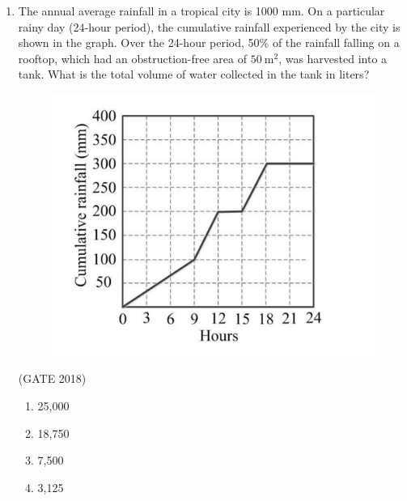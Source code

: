 \documentclass[journal,12pt,onecolumn]{IEEEtran}
\theoremstyle{remark}
\begin{document}
\begin{enumerate}
\item The annual average rainfall in a tropical city is 1000 mm. On a particular rainy day (24-hour period), the cumulative rainfall experienced by the city is shown in the graph. Over the 24-hour period, 50\% of the rainfall falling on a rooftop, which had an obstruction-free area of $50~\text{m}^2$, was harvested into a tank. What is the total volume of water collected in the tank in liters?
\begin{figure}[h]
    \centering
    \includegraphics[width=0.5\linewidth]{GATE-CE-2018/8A-2.png}
    \caption{}
    \label{8a-2}
\end{figure}
\hfill{(GATE 2018)}
\begin{multicols}{4}
\begin{enumerate}
    \item 25,000
    \item 18,750
    \item 7,500
    \item 3,125
\end{enumerate}
\end{multicols}
\vspace{1cm}


\end{enumerate}
\end{document}
